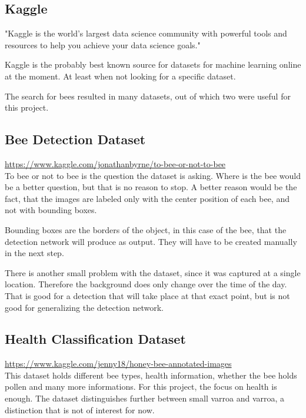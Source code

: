 \documentclass[a4paper,titlepage]{article}
\begin{document}
\subsection{Kaggle}

"Kaggle is the world's largest data science community with powerful tools and resources to help you achieve your data science goals."

Kaggle is the probably best known source for datasets for machine learning online at the moment.
At least when not looking for a specific dataset.

The search for bees resulted in many datasets, out of which two were useful for this project.

\subsection{Bee Detection Dataset}

\href{https://www.kaggle.com/jonathanbyrne/to-bee-or-not-to-bee}{https://www.kaggle.com/jonathanbyrne/to-bee-or-not-to-bee} \\

To bee or not to bee is the question the dataset is asking.
Where is the bee would be a better question, but that is no reason to stop.
A better reason would be the fact, that the images are labeled only with the center position of each bee, and not with bounding boxes.

Bounding boxes are the borders of the object, in this case of the bee, that the detection network will produce as output.
They will have to be created manually in the next step.

There is another small problem with the dataset, since it was captured at a single location.
Therefore the background does only change over the time of the day.
That is good for a detection that will take place at that exact point, but is not good for generalizing the detection network.

\subsection{Health Classification Dataset}

\href{https://www.kaggle.com/jenny18/honey-bee-annotated-images}{https://www.kaggle.com/jenny18/honey-bee-annotated-images} \\

This dataset holds different bee types, health information, whether the bee holds pollen and many more informations.
For this project, the focus on health is enough.
The dataset distinguishes further between small varroa and varroa, a distinction that is not of interest for now.
\end{document}
